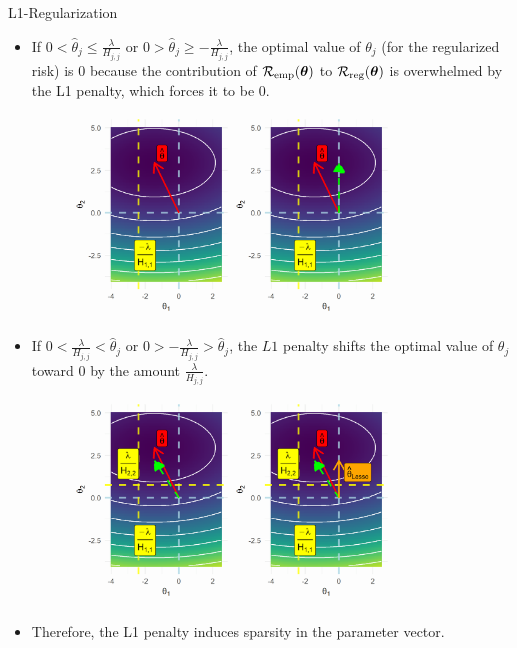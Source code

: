 \documentclass[11pt,compress,t,notes=noshow, xcolor=table]{beamer}
\begin{document}
\begin{vbframe} {L1-Regularization}
\begin{itemize}
\framebreak

\item If  $0 < \hat{\theta}_j \leq \frac{\lambda}{H_{j,j}}$ or $0 > \hat{\theta}_j \geq -\frac{\lambda}{H_{j,j}}$, the optimal value of $\theta_j$ (for the regularized risk) is $0$ because the contribution of  $\mathcal{R}_{\text{emp}}(\bm{\theta})$ to $\mathcal{R}_{\text{reg}}(\bm{\theta})$ is overwhelmed by the L1 penalty, which forces it to be $0$.

\begin{figure}
\includegraphics[width=0.8\textwidth]{figure/l1_reg_hess_01.png}\\
\end{figure}

  \end{itemize}
\framebreak
  \begin{itemize}
  
    \item If $0 < \frac{\lambda}{H_{j,j}} < \hat{\theta}_j$ or  $0 > -\frac{\lambda}{H_{j,j}} > \hat{\theta}_j$, the $L1$ penalty shifts the optimal value of $\theta_j$ toward 0 by the amount $\frac{\lambda}{H_{j,j}}$.

\vfill


\begin{figure}
\includegraphics[width=0.8\textwidth]{figure/l1_reg_hess_02.png}\\
\end{figure}

    \item Therefore, the L1 penalty induces sparsity in the parameter vector.
  \end{itemize}

  
\end{vbframe}

\endlecture
\end{document}
